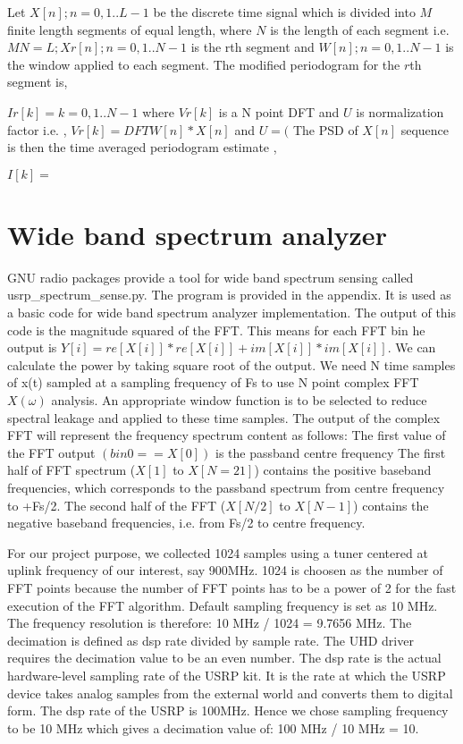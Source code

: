 Let $X[n]; n = 0,1..L-1$ be the discrete time signal which is  divided into 
$M$ 
finite length segments of equal length, where $N$ is the length of each segment  
i.e. $MN = L; Xr[n]; n = 0,1..N-1$ is the rth segment and $W[n]; n = 0,1..N-1$ is 
the window applied to each segment. The modified periodogram for the $r$th segment
 is,

$Ir[k] =      k = 0,1..N-1$
where $Vr[k]$ is a N point DFT and $U$ is normalization factor i.e. , 
$Vr[k] = DFT{W[n]*X[n]}$
and $U = ($
The PSD of $X[n]$ sequence is then the time averaged periodogram estimate ,

$I[k] =$

\section{Wide band spectrum analyzer}

GNU radio packages provide a tool for wide band spectrum sensing 
called 
usrp\_spectrum\_sense.py. The program is provided in the appendix. 
It is used as
a basic code for wide band spectrum analyzer implementation. The output of this 
code is the magnitude squared of the FFT. This means for each FFT bin he output 
is $Y[i] = re[X[i]] *re[X[i]] + im[X[i]]*im[X[i]]$. We can calculate the power by
taking square root of the output. We need N time samples of x(t) sampled at a 
sampling frequency of Fs to use N point complex FFT $X(\omega)$ analysis. An 
appropriate window function is to be selected to reduce spectral leakage and 
applied to these time samples. The output of the complex FFT will represent the 
frequency spectrum content as follows: The first value of the FFT output 
$(bin0 == X[0])$ is the passband centre frequency The first half of FFT spectrum 
($X[1]$ to $X[N=2 1]$) contains the positive baseband frequencies, which corresponds
to the passband spectrum from centre frequency to +Fs/2. The second half of the 
FFT ($X[N/2]$ to $X[N-1]$) contains the negative baseband frequencies, i.e. from 
Fs/2 to centre frequency.


For our project purpose, we collected 1024 samples using a tuner centered at 
uplink frequency of our interest, say 900MHz. 1024 is choosen as the number of 
FFT points because the number of FFT points has to be a power of 2 for the fast 
execution of the FFT algorithm. Default  sampling frequency is set as 10 MHz. 
The frequency resolution is therefore: 10 MHz / 1024 = 9.7656 MHz. The 
decimation is defined as dsp rate divided by sample rate. The UHD driver 
requires the decimation value to be an even number. The dsp rate is the actual 
hardware-level sampling rate of the USRP kit. It is the rate at which the USRP 
device takes analog samples from the external world and converts them to digital
form. The dsp rate of the USRP is 100MHz. Hence we chose sampling frequency to 
be 10 MHz which gives a decimation value of: 100 MHz / 10 MHz = 10.
